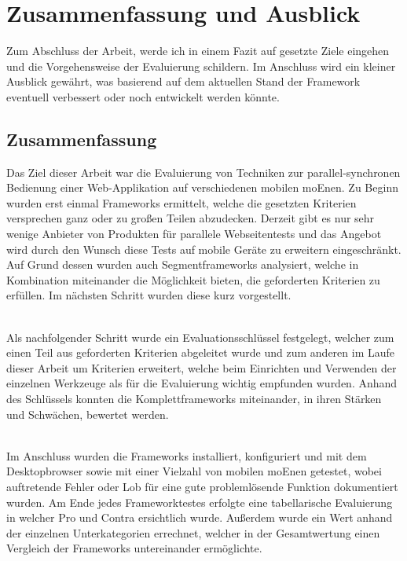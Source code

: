 \chapter{Zusammenfassung und Ausblick}
Zum Abschluss der Arbeit, werde ich in einem Fazit auf gesetzte Ziele eingehen und die Vorgehensweise der Evaluierung schildern. Im Anschluss wird ein kleiner Ausblick gewährt, was basierend auf dem aktuellen Stand der \Gls{Framework} eventuell verbessert oder noch entwickelt werden könnte.

\section{Zusammenfassung}
Das Ziel dieser Arbeit war die Evaluierung von Techniken zur
parallel-synchronen Bedienung einer
Web-Applikation auf verschiedenen
mobilen \Gls{moEn}en. Zu Beginn wurden erst einmal \Gls{Framework}s ermittelt, welche die gesetzten Kriterien versprechen ganz oder zu großen Teilen abzudecken. 
Derzeit gibt es nur sehr wenige Anbieter von Produkten für parallele Webseitentests und das Angebot wird durch den Wunsch diese Tests auf mobile Geräte zu erweitern eingeschränkt. Auf Grund dessen wurden auch Segmentframeworks analysiert, welche in Kombination miteinander die Möglichkeit bieten, die geforderten Kriterien zu erfüllen. Im nächsten Schritt wurden diese kurz vorgestellt.

\\Als nachfolgender Schritt wurde ein Evaluationsschlüssel festgelegt, welcher zum einen Teil aus geforderten Kriterien abgeleitet wurde und zum anderen im Laufe dieser Arbeit um Kriterien erweitert, welche beim Einrichten und Verwenden der einzelnen Werkzeuge als für die Evaluierung wichtig empfunden wurden. Anhand des Schlüssels konnten die Komplettframeworks miteinander, in ihren Stärken und Schwächen, bewertet werden.

\\Im Anschluss wurden die \Gls{Framework}s installiert, konfiguriert und mit dem Desktopbrowser sowie mit einer Vielzahl von mobilen \Gls{moEn}en getestet, wobei auftretende Fehler oder Lob für eine gute problemlösende Funktion dokumentiert wurden. Am Ende jedes \Gls{Framework}testes erfolgte eine tabellarische Evaluierung in welcher Pro und Contra ersichtlich wurde. Außerdem wurde ein Wert anhand der einzelnen Unterkategorien errechnet, welcher in der Gesamtwertung einen Vergleich der \Gls{Framework}s untereinander ermöglichte.

